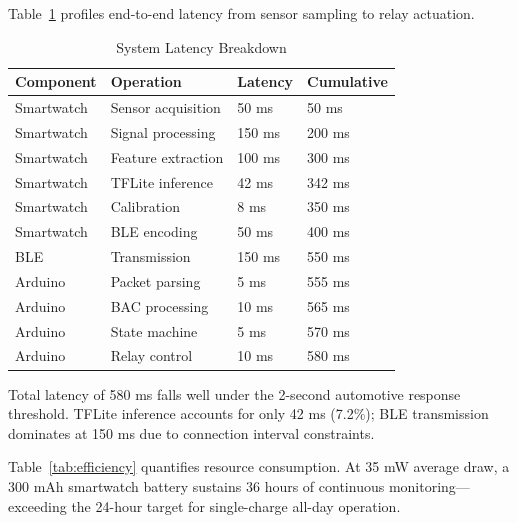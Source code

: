 \documentclass[HARVARD,Times2COL]{WileyNJDv5}
\begin{document}
Table~\ref{tab:latency} profiles end-to-end latency from sensor sampling to relay actuation.

\begin{table}[htbp]
\caption{System Latency Breakdown}
\label{tab:latency}
\centering
\small
\begin{tabular}{@{}llll@{}}
\toprule
\textbf{Component} & \textbf{Operation} & \textbf{Latency} & \textbf{Cumulative} \\
\midrule
Smartwatch & Sensor acquisition & 50 ms & 50 ms \\
Smartwatch & Signal processing & 150 ms & 200 ms \\
Smartwatch & Feature extraction & 100 ms & 300 ms \\
Smartwatch & TFLite inference & 42 ms & 342 ms \\
Smartwatch & Calibration & 8 ms & 350 ms \\
Smartwatch & BLE encoding & 50 ms & 400 ms \\
BLE & Transmission & 150 ms & 550 ms \\
Arduino & Packet parsing & 5 ms & 555 ms \\
Arduino & BAC processing & 10 ms & 565 ms \\
Arduino & State machine & 5 ms & 570 ms \\
Arduino & Relay control & 10 ms & 580 ms \\
\bottomrule
\end{tabular}
\end{table}

Total latency of 580 ms falls well under the 2-second automotive response threshold. TFLite inference accounts for only 42 ms (7.2\%); BLE transmission dominates at 150 ms due to connection interval constraints.

Table~\ref{tab:efficiency} quantifies resource consumption. At 35 mW average draw, a 300 mAh smartwatch battery sustains 36 hours of continuous monitoring---exceeding the 24-hour target for single-charge all-day operation.
\end{document}
